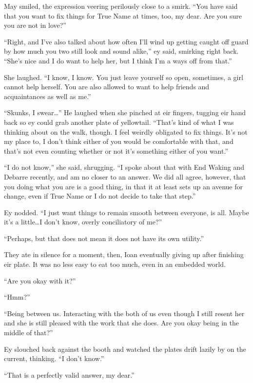 May smiled, the expression veering perilously close to a smirk. ``You have said that you want to fix things for True Name at times, too, my dear. Are you sure you are not in love?''

``Right, and I've also talked about how often I'll wind up getting caught off guard by how much you two still look and sound alike,'' ey said, smirking right back. ``She's nice and I do want to help her, but I think I'm a ways off from that.''

She laughed. ``I know, I know. You just leave yourself so open, sometimes, a girl cannot help herself. You are also allowed to want to help friends and acquaintances as well as me.''

``Skunks, I swear\ldots{}'' He laughed when she pinched at eir fingers, tugging eir hand back so ey could grab another plate of yellowtail. ``That's kind of what I was thinking about on the walk, though. I feel weirdly obligated to fix things. It's not my place to, I don't think either of you would be comfortable with that, and that's not even counting whether or not it's something either of you want.''

``I do not know,'' she said, shrugging. ``I spoke about that with End Waking and Debarre recently, and am no closer to an answer. We did all agree, however, that you doing what you are is a good thing, in that it at least sets up an avenue for change, even if True Name or I do not decide to take that step.''

Ey nodded. ``I just want things to remain smooth between everyone, is all. Maybe it's a little\ldots I don't know, overly conciliatory of me?''

``Perhaps, but that does not mean it does not have its own utility.''

They ate in silence for a moment, then, Ioan eventually giving up after finishing eir plate. It was no less easy to eat too much, even in an embedded world.

``Are you okay with it?''

``Hmm?''

``Being between us. Interacting with the both of us even though I still resent her and she is still pleased with the work that she does. Are you okay being in the middle of that?''

Ey slouched back against the booth and watched the plates drift lazily by on the current, thinking. ``I don't know.''

``That is a perfectly valid answer, my dear.''

